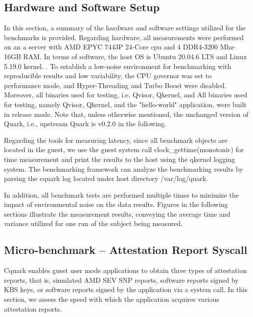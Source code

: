 \subsection{Hardware and Software Setup}

In this section, a summary of the hardware and software settings utilized for the benchmarks is provided. Regarding hardware, all measurements were performed on an a server with AMD EPYC 7443P 24-Core cpu and 4 DDR4-3200 Mhz-16GB RAM. In terms of software, the host OS is Ubuntu 20.04.6 LTS and Linux 5.19.0 kernel. . To establish a low-noise environment for benchmarking with reproducible results and low variability, the CPU governor was set to performance mode, and Hyper-Threading and Turbo Boost were disabled.  Moreover, all binaries used for testing, i.e. Qvisor, Qkernel, and All binaries used for testing, namely Qvisor, Qkernel, and the "hello-world" application, were built in release mode. Note that, unless otherwise mentioned, the unchanged version of Quark, i.e., upstream Quark is v0.2.0 in the following.


Regarding the tools for measuring latency, since all benchmark objects are located in the guest, we use the guest system call clock\_gettime(monotonic) for time measurement and print the results to the host using the qkernel logging system. The benchmarking framework can analyze the benchmarking results by parsing the cquark log located under host directory /var/log/quark.

In addition, all benchmark tests are performed multiple times to minimize the impact of environmental noise on the data results. Figures in the following sections illustrate the measurement results, conveying the average time and variance utilized for one run of the subject being measured.

\subsection{Micro-benchmark – Attestation Report Syscall}

Cquark enables guest user mode applications to obtain three types of attestation reports, that is, simulated AMD SEV SNP reports, software reports signed by KBS keys, or software reports signed by the application via a system call. In this section, we assess the speed with which the application 
acquires various attestation reports.

